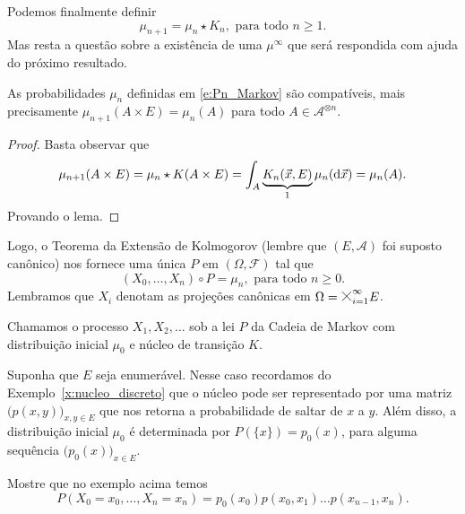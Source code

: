 \begin{topics}
Podemos finalmente definir
\begin{equation}
  \label{e:Pn_Markov}
  \mu_{n+1} = \mu_n \star K_n, \text{ para todo $n \geq 1$}.
\end{equation}
Mas resta a questão sobre a existência de uma $\mu^\infty$ que será respondida com ajuda do próximo resultado.

\begin{lemma}
  As probabilidades $\mu_n$ definidas em \eqref{e:Pn_Markov} são compatíveis, mais precisamente $\mu_{n+1}(A \times E) = \mu_n(A)$ para todo $A \in \mathcal{A}^{\otimes n}$.
\end{lemma}

\begin{proof}
  Basta observar que
  \begin{equation}
    \mu_{n+1}(A \times E) = \mu_n \star K (A \times E) = \int_{A} \underbrace{K_n (\vec{x}, E)}_1 \mu_n(\mathop{}\!\mathrm{d} \vec{x}) = \mu_n(A).
  \end{equation}
  Provando o lema.
\end{proof}

Logo, o Teorema da Extensão de Kolmogorov (lembre que $(E, \mathcal{A})$ foi suposto canônico) nos fornece uma única $P$ em $(\Omega, \mathcal{F})$ tal que
\begin{equation}
  (X_0, \dots, X_n) \circ P = \mu_n, \text{ para todo $n \geq 0$}.
\end{equation}
Lembramos que $X_i$ denotam as projeções canônicas em $\Omega = \mtimes_{i=1}^\infty E$.

Chamamos o processo $X_1, X_2, \dots$ sob a lei $P$ da Cadeia de Markov  com distribuição inicial $\mu_0$ e núcleo de transição $K$.

\begin{example}
  \label{x:Markov_p_xy}
  Suponha que $E$ seja enumerável.
  Nesse caso recordamos do Exemplo~\ref{x:nucleo_discreto} que o núcleo pode ser representado por uma matriz $\big(p(x,y)\big)_{x,y \in E}$ que nos retorna a probabilidade de saltar de $x$ a $y$.
  Além disso, a distribuição inicial $\mu_0$ é determinada por $P(\{x\}) = p_0(x)$, para alguma sequência $\big(p_0(x)\big)_{x \in E}$.
\end{example}

\begin{exercise}
  Mostre que no exemplo acima temos
  \begin{equation}
    P(X_0 = x_0, \dots, X_n = x_n) = p_0(x_0) p(x_0, x_1) \dots p(x_{n-1}, x_n).
  \end{equation}
\end{exercise}


\end{topics}
